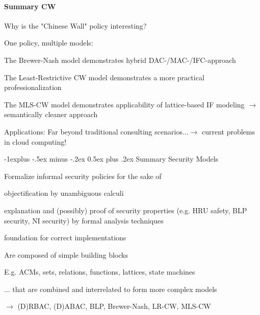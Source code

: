 \documentclass[a4paper]{article}
\makeatletter
\renewcommand{\subsection}{\@startsection{subsection}{2}{0mm}%
                                {-1explus -.5ex minus -.2ex}%
                                {0.5ex plus .2ex}%
                                {\normalfont\normalsize\bfseries}}
\makeatother
\begin{document}
\begin{multicols}{3}
    \paragraph{Summary CW}
    Why is the "Chinese Wall" policy interesting?
    \begin{itemize*}
        \item One policy, multiple models:
        \begin{itemize*}
            \item The Brewer-Nash model demonstrates hybrid DAC-/MAC-/IFC-approach
            \item The Least-Restrictive CW model demonstrates a more practical professionalization
            \item The MLS-CW model demonstrates applicability of lattice-based IF modeling $\rightarrow$ semantically cleaner approach
        \end{itemize*}
        \item Applications: Far beyond traditional consulting scenarios...$\rightarrow$ current problems in cloud computing!
    \end{itemize*}


    \subsection{Summary}
    Security Models
    \begin{itemize*}
        \item Formalize informal security policies for the sake of
        \begin{itemize*}
            \item objectification by unambiguous calculi
            \item explanation and (possibly) proof of security properties (e.g. HRU safety, BLP security, NI security) by formal analysis techniques
            \item foundation for correct implementations
        \end{itemize*}
        \item Are composed of simple building blocks
        \begin{itemize*}
            \item E.g. ACMs, sets, relations, functions, lattices, state machines
            \item ... that are combined and interrelated to form more complex models
            \item $\rightarrow$ (D)RBAC, (D)ABAC, BLP, Brewer-Nash, LR-CW, MLS-CW
        \end{itemize*}
    \end{itemize*}


\end{multicols}
\end{document}
